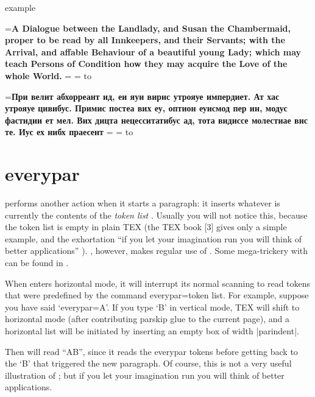 \begin{scriptexample}{example}{}
\def\russiantitlei#1{%
       \bgroup
       \setbox0=\vbox{\bf\noindent #1}%
       \setbox1=\vbox{%
            \unvbox0
            \setbox2=\lastbox
            \hbox to \linewidth{\hfill\unhbox2}%
       }%
      \egroup
  }%

\russiantitlei{A Dialogue between the Landlady, and Susan the Chambermaid, proper to be
read by all Innkeepers, and their Servants; with the Arrival, and
affable Behaviour of a beautiful young Lady; which may teach Persons of
Condition how they may acquire the Love of the whole World.}

\russiantitlei{При велит абхорреант ид, еи яуи вирис утрояуе импердиет. Ат хас утрояуе цивибус. Примис постеа вих еу, оптион еуисмод пер ин, модус фастидии ет мел. Вих дицта нецесситатибус ад, тота видиссе молестиае вис те. Иус ех нибх праесент}

\end{scriptexample}

\section{everypar}

\tex performs another action when it starts a paragraph:
it inserts whatever is currently the contents of the \emph{token
list} . Usually you will not notice this, because
the token list is empty in plain TEX (the TEX book [3]
gives only a simple example, and the exhortation  \enquote{if you
let your imagination run you will think of better applications} ).
\latex, however, makes regular use of
. Some mega-trickery with 
can be found in \cite{Lamport1994}. 

When \tex enters horizontal mode, it will interrupt its normal scanning to read
tokens that were predefined by the command everypar={token list}. For
example, suppose you have said `everypar={A}'. If you type `B' in vertical mode, TEX
will shift to horizontal mode (after contributing parskip glue to the current page),
and a horizontal list will be initiated by inserting an empty box of width |parindent|.

Then \tex will read \enquote{AB}, since it reads the everypar tokens before getting back to the
`B' that triggered the new paragraph. Of course, this is not a very useful illustration of
; but if you let your imagination run you will think of better applications.

